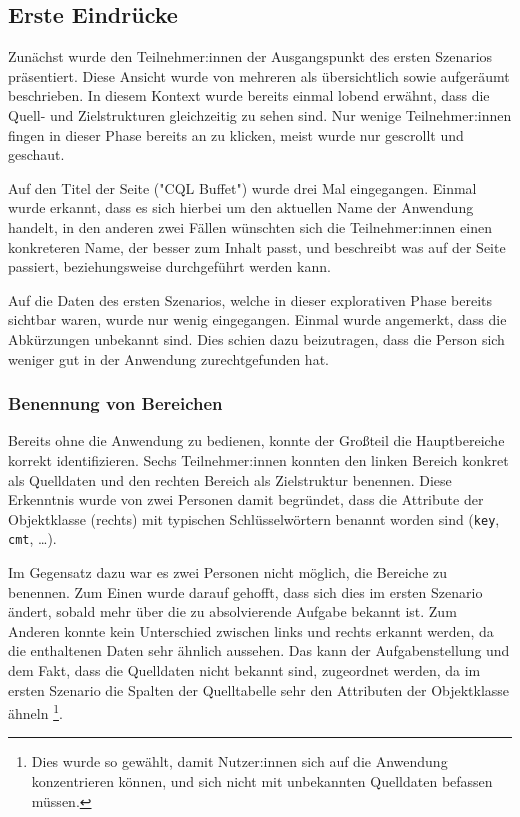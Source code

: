 \subsection{Erste Eindrücke}
\label{sec:impressions}

Zunächst wurde den Teilnehmer:innen der Ausgangspunkt des ersten Szenarios präsentiert. Diese Ansicht wurde von mehreren als übersichtlich sowie aufgeräumt beschrieben. In diesem Kontext wurde bereits einmal lobend erwähnt, dass die Quell- und Zielstrukturen gleichzeitig zu sehen sind. Nur wenige Teilnehmer:innen fingen in dieser Phase bereits an zu klicken, meist wurde nur gescrollt und geschaut.

Auf den Titel der Seite ("CQL Buffet") wurde drei Mal eingegangen. Einmal wurde erkannt, dass es sich hierbei um den aktuellen Name der Anwendung handelt, in den anderen zwei Fällen wünschten sich die Teilnehmer:innen einen konkreteren Name, der besser zum Inhalt passt, und beschreibt was auf der Seite passiert, beziehungsweise durchgeführt werden kann.

Auf die Daten des ersten Szenarios, welche in dieser explorativen Phase bereits sichtbar waren, wurde nur wenig eingegangen. Einmal wurde angemerkt, dass die Abkürzungen unbekannt sind. Dies schien dazu beizutragen, dass die Person sich weniger gut in der Anwendung zurechtgefunden hat.

\subsubsection{Benennung von Bereichen}

Bereits ohne die Anwendung zu bedienen, konnte der Großteil die Hauptbereiche korrekt identifizieren. Sechs Teilnehmer:innen konnten den linken Bereich konkret als Quelldaten und den rechten Bereich als Zielstruktur benennen. Diese Erkenntnis wurde von zwei Personen damit begründet, dass die Attribute der Objektklasse (rechts) mit typischen Schlüsselwörtern benannt worden sind (\texttt{key}, \texttt{cmt}, \dots).

Im Gegensatz dazu war es zwei Personen nicht möglich, die Bereiche zu benennen. Zum Einen wurde darauf gehofft, dass sich dies im ersten Szenario ändert, sobald mehr über die zu absolvierende Aufgabe bekannt ist. Zum Anderen konnte kein Unterschied zwischen links und rechts erkannt werden, da die enthaltenen Daten sehr ähnlich aussehen. Das kann der Aufgabenstellung und dem Fakt, dass die Quelldaten nicht bekannt sind, zugeordnet werden, da im ersten Szenario die Spalten der Quelltabelle sehr den Attributen der Objektklasse ähneln \footnote{Dies wurde so gewählt, damit Nutzer:innen sich auf die Anwendung konzentrieren können, und sich nicht mit unbekannten Quelldaten befassen müssen.}.

